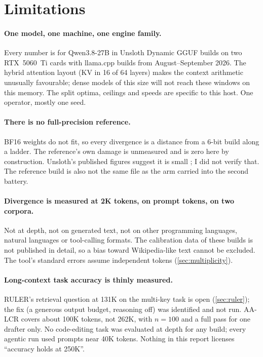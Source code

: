 \section{Limitations}\label{sec:limits}

\paragraph{One model, one machine, one engine family.} Every number is for Qwen3.8-27B in Unsloth
Dynamic GGUF builds on two RTX~5060~Ti cards with llama.cpp builds from August--September 2026. The
hybrid attention layout (KV in 16 of 64 layers) makes the context arithmetic unusually favourable;
dense models of this size will not reach these windows on this memory. The split optima, ceilings and
speeds are specific to this host. One operator, mostly one seed.

\paragraph{There is no full-precision reference.} BF16 weights do not fit, so every divergence is a
distance from a 6-bit build along a ladder. The reference's own damage is unmeasured and is zero here
by construction. Unsloth's published figures suggest it is small \citep{unsloth_dynamic3}; I did not
verify that. The reference build \QsixXL{} is also not the same file as the \Qsix{} arm carried into
the second battery.

\paragraph{Divergence is measured at 2K tokens, on prompt tokens, on two corpora.} Not at depth, not on
generated text, not on other programming languages, natural languages or tool-calling formats. The
calibration data of these builds is not published in detail, so a bias toward Wikipedia-like text
cannot be excluded. The tool's standard errors assume independent tokens (\cref{sec:multiplicity}).

\paragraph{Long-context task accuracy is thinly measured.} RULER's retrieval question at 131K on the
multi-key task is open (\cref{sec:ruler}); the fix (a generous output budget, reasoning off) was
identified and not run. AA-LCR covers about 100K tokens, not 262K, with $n=100$ and a full pass for one
drafter only. No code-editing task was evaluated at depth for any build; every agentic run used
prompts near 40K tokens. Nothing in this report licenses ``accuracy holds at 250K''.

